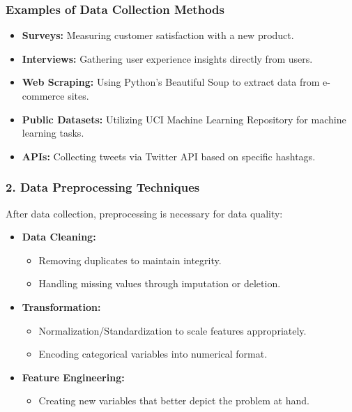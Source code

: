 \documentclass[aspectratio=169]{beamer}
\begin{document}
\begin{frame}[fragile]
    \frametitle{Examples of Data Collection Methods}
    \begin{itemize}
        \item \textbf{Surveys:} Measuring customer satisfaction with a new product.
        \item \textbf{Interviews:} Gathering user experience insights directly from users.
        \item \textbf{Web Scraping:} Using Python's Beautiful Soup to extract data from e-commerce sites.
        \item \textbf{Public Datasets:} Utilizing UCI Machine Learning Repository for machine learning tasks.
        \item \textbf{APIs:} Collecting tweets via Twitter API based on specific hashtags.
    \end{itemize}
\end{frame}

\begin{frame}[fragile]
    \frametitle{2. Data Preprocessing Techniques}
    After data collection, preprocessing is necessary for data quality:
    \begin{itemize}
        \item \textbf{Data Cleaning:}
            \begin{itemize}
                \item Removing duplicates to maintain integrity.
                \item Handling missing values through imputation or deletion.
            \end{itemize}
        \item \textbf{Transformation:}
            \begin{itemize}
                \item Normalization/Standardization to scale features appropriately.
                \item Encoding categorical variables into numerical format.
            \end{itemize}
        \item \textbf{Feature Engineering:}
            \begin{itemize}
                \item Creating new variables that better depict the problem at hand.
            \end{itemize}
    \end{itemize}
\end{frame}
\end{document}
